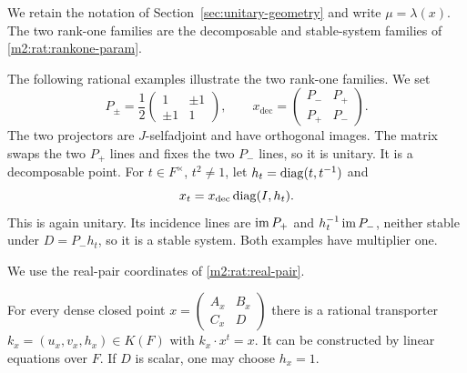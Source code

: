We retain the notation of Section~\ref{sec:unitary-geometry} and
write $\mu=\lambda(x)$. The two rank-one families are the
decomposable and stable-system families of \cref{m2:rat:rankone-param}.

The following rational examples illustrate the two rank-one
families. We set
\[
 P_\pm=\frac12\begin{pmatrix}1&\pm1\\\pm1&1\end{pmatrix},
 \qquad
 x_{\mathrm{dec}}=\begin{pmatrix}P_-&P_+\\P_+&P_-\end{pmatrix}.
\]
The two projectors are $J$-selfadjoint and have orthogonal
images.  The matrix swaps the two $P_+$ lines and fixes
the two $P_-$ lines, so it is unitary.  It is a
decomposable point.  For $t\in F^\times$, $t^2\ne1$,
let $h_t=\operatorname{diag}(t,t^{-1})$ and
\begin{equation}\label{m2:rat:rankone-examples}
 x_t=x_{\mathrm{dec}}\operatorname{diag}(I,h_t).
\end{equation}
This is again unitary.  Its incidence lines are
$\operatorname{im} P_+$ and $h_t^{-1}\operatorname{im} P_-$, neither stable under
$D=P_-h_t$, so it is a stable system.  Both examples have multiplier one.

We use the real-pair coordinates of \cref{m2:rat:real-pair}.

\begin{lemma}\label{m2:rat:dense-transporter}
For every dense closed point
$x=\left(\begin{smallmatrix}A_x&B_x\\C_x&D\end{smallmatrix}\right)$
there is a rational transporter $k_x=(u_x,v_x,h_x)\in K(F)$
with $k_x\cdot x^t=x$.  It can be constructed by
linear equations over $F$.  If $D$ is scalar, one may
choose $h_x=1$.
\end{lemma}

